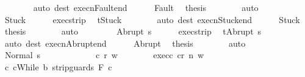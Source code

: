 \begin{isabellebody}
\ \ \ \ \ \ \isamarkupfalse%
\ {\isacharparenleft}auto\ dest{\isacharcolon}\ execn{\isacharunderscore}Fault{\isacharunderscore}end{\isacharparenright}\isanewline
\ \ \ \ \isamarkupfalse%
\ Fault\ \isamarkupfalse%
\ {\isacharquery}thesis\isanewline
\ \ \ \ \ \ \isamarkupfalse%
\ auto\isanewline
\ \ \isamarkupfalse%
\isanewline
\ \ \ \ \isamarkupfalse%
\ Stuck\isanewline
\ \ \ \ \isamarkupfalse%
\ exec{\isacharunderscore}strip\ \isamarkupfalse%
\ {\isachardoublequoteopen}t{\isacharequal}Stuck{\isachardoublequoteclose}\isanewline
\ \ \ \ \ \ \isamarkupfalse%
\ {\isacharparenleft}auto\ dest{\isacharcolon}\ execn{\isacharunderscore}Stuck{\isacharunderscore}end{\isacharparenright}\isanewline
\ \ \ \ \isamarkupfalse%
\ Stuck\ \isamarkupfalse%
\ {\isacharquery}thesis\isanewline
\ \ \ \ \ \ \isamarkupfalse%
\ auto\isanewline
\ \ \isamarkupfalse%
\isanewline
\ \ \ \ \isamarkupfalse%
\ {\isacharparenleft}Abrupt\ s{\isacharprime}{\isacharparenright}\isanewline
\ \ \ \ \isamarkupfalse%
\ exec{\isacharunderscore}strip\ \isamarkupfalse%
\ {\isachardoublequoteopen}t{\isacharequal}Abrupt\ s{\isacharprime}{\isachardoublequoteclose}\isanewline
\ \ \ \ \ \ \isamarkupfalse%
\ {\isacharparenleft}auto\ dest{\isacharcolon}\ execn{\isacharunderscore}Abrupt{\isacharunderscore}end{\isacharparenright}\isanewline
\ \ \ \ \isamarkupfalse%
\ Abrupt\ \isamarkupfalse%
\ {\isacharquery}thesis\isanewline
\ \ \ \ \ \ \isamarkupfalse%
\ auto\isanewline
\ \ \isamarkupfalse%
\isanewline
\ \ \ \ \isamarkupfalse%
\ {\isacharparenleft}Normal\ s{\isacharprime}{\isacharparenright}\isanewline
\ \ \ \ \isacommand{{\isacharbraceleft}}\isamarkupfalse%
\isanewline
\ \ \ \ \ \ \isamarkupfalse%
\ c{\isacharprime}\ r\ w\isanewline
\ \ \ \ \ \ \isamarkupfalse%
\ exec{\isacharunderscore}c{\isacharprime}{\isacharcolon}\ {\isachardoublequoteopen}{\isasymGamma}{\isasymturnstile}{\isasymlangle}c{\isacharprime}{\isacharcomma}r{\isasymrangle}\ {\isacharequal}n{\isasymRightarrow}\ w{\isachardoublequoteclose}\isanewline
\ \ \ \ \ \ \isamarkupfalse%
\ c{\isacharprime}{\isacharcolon}\ {\isachardoublequoteopen}c{\isacharprime}{\isacharequal}While\ b\ {\isacharparenleft}strip{\isacharunderscore}guards\ F\ c{\isacharparenright}{\isachardoublequoteclose}\isanewline

\end{isabellebody}
